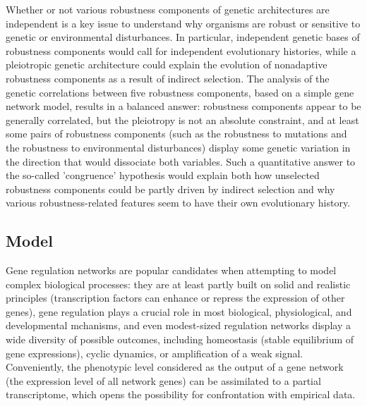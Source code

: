 \documentclass[10pt,a4paper]{article}
\begin{document}
Whether or not various robustness components of genetic architectures are independent is a key issue to understand why organisms are robust or sensitive to genetic or environmental disturbances. In particular, independent genetic bases of robustness components would call for independent evolutionary histories, while a pleiotropic genetic architecture could explain the evolution of nonadaptive robustness components as a result of indirect selection. The analysis of the genetic correlations between five robustness components, based on a simple gene network model, results in a balanced answer: robustness components appear to be generally correlated, but the pleiotropy is not an absolute constraint, and at least some pairs of robustness components (such as the robustness to mutations and the robustness to environmental disturbances) display some genetic variation in the direction that would dissociate both variables. Such a quantitative answer to the so-called 'congruence' hypothesis \citep{dHW+03} would explain both how unselected robustness components could be partly driven by indirect selection and why various robustness-related features seem to have their own evolutionary history. 

\subsection{Model}

Gene regulation networks are popular candidates when attempting to model complex biological processes: they are at least partly built on solid and realistic principles (transcription factors can enhance or repress the expression of other genes), gene regulation plays a crucial role in most biological, physiological, and developmental mchanisms, and even modest-sized regulation networks display a wide diversity of possible outcomes, including homeostasis (stable equilibrium of gene expressions), cyclic dynamics, or amplification of a weak signal. Conveniently, the phenotypic level considered as the output of a gene network (the expression level of all network genes) can be assimilated to a partial transcriptome, which opens the possibility for confrontation with empirical data. 
\end{document}
